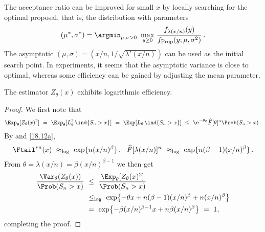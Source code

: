 \begin{remark}
The acceptance ratio can be improved for small $x$ by locally searching for the optimal proposal, that is, the distribution with parameters
\[ (\mu^*,\sigma^*) = \argmin_{\mu,\sigma > 0} \,\, \max_{y \ge 0} \, \frac{ f_{\lambda(x/n)}(y) }{ f_{\mathrm{Prop}}(y ; \mu,\sigma^2) } \,. \]
The asymptotic $(\mu,\sigma)=(x/n, 1/\sqrt{\lambda'(x/n)})$ can be used as the initial search point. In experiments, it seems that the asymptotic variance is close to optimal, whereas some efficiency can be gained by adjusting the mean parameter.
\remQED\end{remark}

\begin{proposition}\label{Prop:PL}
The estimator $Z_\theta(x)$ exhibits logarithmic efficiency.
\end{proposition}
\begin{proof}
We first note that
\begin{align*}
 \Exp_\theta[ Z_\theta(x)^2 ]\ =\ \Exp_\theta[L_\theta^2 \, \ind{S_n>x}]
 \ =\ \Exp[L_\theta \, \ind{S_n>x}]\ \le\ \e^{-\theta x } \widehat F[\theta]^n  \Prob(S_n > x)\,.
\end{align*}
By  and \eqref{18.12a},
\[\Ftail^{*n}(x)\ \approx_{\log}\ \exp \{ n(x/n)^\beta \}\,,\ \  \widehat{F}[\lambda(x/n)]^{n}\ \approx_{\log}\ \exp \{ n(\beta-1)(x/n)^\beta \} \,.\]
From $\theta=\lambda(x/n)=\beta (x/n)^{\beta-1}$ we then get
\begin{align*}\frac{ \Var_{\theta}(Z_\theta(x)) }{ \Prob(S_n>x) }\ &\le\
\frac{ \Exp_\theta[ Z_\theta(x)^2 ] }{ \Prob(S_n>x) }\\ &\le_{\log}\
\exp\bigl\{-\theta x + n(\beta-1)(x/n)^\beta + n (x/n)^{\beta}\bigr\} \\
&=\ \exp\bigl\{-\beta (x/n)^{\beta-1} x + n\beta(x/n)^\beta\bigr\} \ =\  1,
\end{align*}
completing the proof.
\end{proof}

